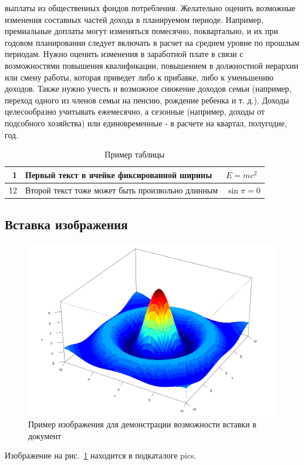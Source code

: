 выплаты из общественных фондов потребления. Желательно оценить возможные изменения составных частей дохода в планируемом периоде. Например, премиальные доплаты могут изменяться помесячно, поквартально, и их
при годовом планировании следует включать в расчет на среднем уровне по
прошлым периодам. Нужно оценить изменения в заработной плате в связи с возможностями повышения квалификации, повышением в должностной
иерархии или смену работы, которая приведет либо к прибавке, либо к уменьшению доходов. Также нужно учесть и возможное снижение доходов семьи
(например, переход одного из членов семьи на пенсию, рождение ребенка и
т. д.).
Доходы целесообразно учитывать ежемесячно, а сезонные (например, доходы от подсобного хозяйства) или единовременные - в расчете на квартал,
полугодие, год.
\begin{table}[H]
\caption{Пример таблицы}
\label{tab:t1}
\begin{center}
\begin{tabular}{|r|p{5.5cm}|p{2.5cm}|}
\hline 
1 & Первый текст в ячейке фиксированной ширины & $E=mc^2 $ \\ 
\hline 
12 & Второй текст тоже может быть произвольно длинным & $\sin \pi = 0 $ \\ 
\hline 
\end{tabular} 
\end{center}
\end{table}

\subsection{Вставка изображения}

\begin{figure}[H]
	\centering
	\includegraphics[width=0.7\linewidth]{pics/pic3D.png}
	\caption{Пример изображения для демонстрации возможности вставки в документ}
	\label{fig:pic3d}
\end{figure}



Изображение на рис.~\ref{fig:pic3d} находится в подкаталоге pics.


